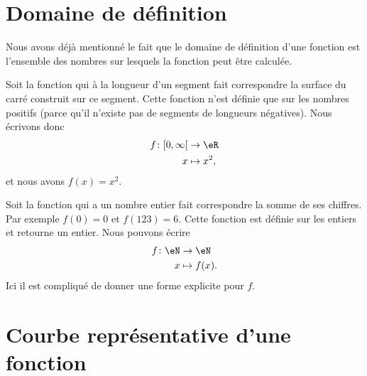 \section{Domaine de définition}

Nous avons déjà mentionné le fait que le domaine de définition d'une fonction est l'ensemble des nombres sur lesquels la fonction peut être calculée.

\begin{example}
    Soit la fonction qui à la longueur d'un segment fait correspondre la surface du carré construit sur ce segment. Cette fonction n'est définie que sur les nombres positifs (parce qu'il n'existe pas de segments de longueurs négatives). Nous écrivons donc
    \begin{equation}
        \begin{aligned}
            f\colon \mathopen[ 0 , \infty [&\to \eR \\
            x&\mapsto x^2,
        \end{aligned}
    \end{equation}
    et nous avons \( f(x)=x^2\).
\end{example}

\begin{example}
    Soit la fonction qui a un nombre entier fait correspondre la somme de ses chiffres. Par exemple \( f(0)=0\) et \( f(123)=6\). Cette fonction est définie sur les entiers et retourne un entier. Nous pouvons écrire
    \begin{equation}
        \begin{aligned}
            f\colon \eN&\to \eN \\
            x&\mapsto f(x). 
        \end{aligned}
    \end{equation}
    Ici il est compliqué de donner une forme explicite pour \( f\).
\end{example}

\section{Courbe représentative d'une fonction}

